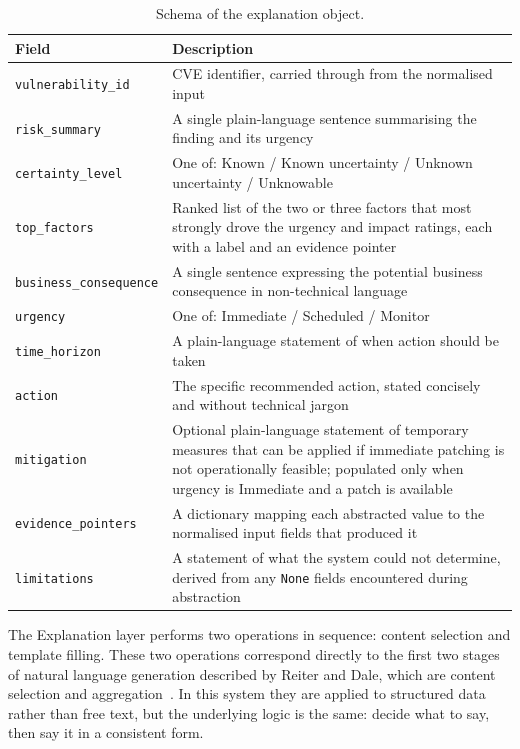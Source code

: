 \begin{table}[h]
\centering
\begin{tabular}{@{}lp{}@{}}
\toprule
\textbf{Field} & \textbf{Description} \\
\midrule
\texttt{vulnerability\_id}     & CVE identifier, carried through from the normalised input \\
\texttt{risk\_summary}         & A single plain-language sentence summarising the finding and its urgency \\
\texttt{certainty\_level}      & One of: Known / Known uncertainty / Unknown uncertainty / Unknowable \\
\texttt{top\_factors}          & Ranked list of the two or three factors that most strongly drove the urgency and impact ratings, each with a label and an evidence pointer \\
\texttt{business\_consequence} & A single sentence expressing the potential business consequence in non-technical language \\
\texttt{urgency}               & One of: Immediate / Scheduled / Monitor \\
\texttt{time\_horizon}         & A plain-language statement of when action should be taken \\
\texttt{action}                & The specific recommended action, stated concisely and without technical jargon \\
\texttt{mitigation}            & Optional plain-language statement of temporary measures that can be applied if immediate patching is not operationally feasible; populated only when urgency is Immediate and a patch is available \\
\texttt{evidence\_pointers}    & A dictionary mapping each abstracted value to the normalised input fields that produced it \\
\texttt{limitations}           & A statement of what the system could not determine, derived from any \texttt{None} fields encountered during abstraction \\
\bottomrule
\end{tabular}
\caption{Schema of the explanation object.}
\label{tab:explanation-object}
\end{table}

The Explanation layer performs two operations in sequence: content selection and template filling. These two operations correspond directly to the first two stages of natural language generation described by Reiter and Dale, which are content selection and aggregation~\cite{reiter2000nlg}. In this system they are applied to structured data rather than free text, but the underlying logic is the same: decide what to say, then say it in a consistent form.

